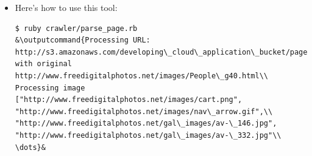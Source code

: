 \documentclass{beamer}
\newcommand{\outputcommand}[1]{\color{darkgreen}{#1|}}
\begin{document}
\begin{frame}
\begin{itemize}
\item Here’s how to use this tool:
\lstset{language=shell}
\begin{lstlisting}[escapechar=&]
$ ruby crawler/parse_page.rb 
&\outputcommand{Processing URL: http://s3.amazonaws.com/developing\_cloud\_application\_bucket/page\_a1690b0f6347aadb4d700c627c8fe3a8.html with original http://www.freedigitalphotos.net/images/People\_g40.html\\
Processing image ["http://www.freedigitalphotos.net/images/cart.png", "http://www.freedigitalphotos.net/images/nav\_arrow.gif",\\ "http://www.freedigitalphotos.net/gal\_images/av-\_146.jpg", "http://www.freedigitalphotos.net/gal\_images/av-\_332.jpg"\\
\dots}&
\end{lstlisting}

\end{itemize}
\end{frame}
\end{document}
